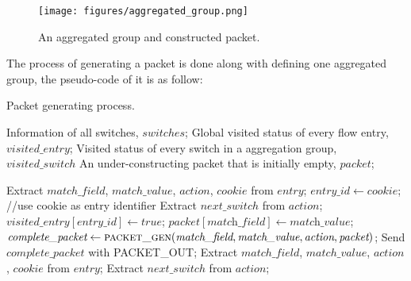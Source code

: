 \begin{figure}[H]
\begin{center}
\texttt{[image: figures/aggregated\_group.png]}
\end{center}
\caption{An aggregated group and constructed packet.}
\label{aggregated_group}
\end{figure}

The process of generating a packet is done along with defining one aggregated group, the pseudo-code of it is as follow:

\begin {tcolorbox}[blanker,float=tbp,
grow to left by=1cm, grow to right by=1cm]
\begin{algorithm}[H]

  \caption{Packet generating process.}
  \begin{algorithmic}[1]
    \Require
      Information of all switches, $switches$;
      Global visited status of every flow entry, $visited\_entry$;
      Visited status of every switch in a aggregation group, $visited\_switch$
      An under-constructing packet that is initially empty, $packet$; 

          \State Extract $match\_field$, $match\_value$, $action$, $cookie$ from $entry$;
          \State $entry\_id \gets \textit{cookie}$; //use cookie as entry identifier
          \State 
          \State Extract $next\_switch$ from $action$;
            \State $\textit{visited\_entry}[\textit{entry\_id}] \gets true$;
            \State $packet[\textit{match\_field}] \gets \textit{match\_value}$;
            \State $\textit{complete\_packet} \gets \Call{packet\_gen}{\textit{match\_field}, \textit{match\_value}, \textit{action}, \textit{packet}}$;
            \State Send $\textit{complete\_packet}$ with PACKET\_OUT;
          \EndIf
      \EndFor
        \EndFor
    \EndFunction
    \State
        \State Extract $match\_field$, $match\_value$, $action$, $cookie$ from $entry$;
        \State Extract $next\_switch$ from $action$; 
  \end{algorithmic}
\end{algorithm}
\end{tcolorbox}

